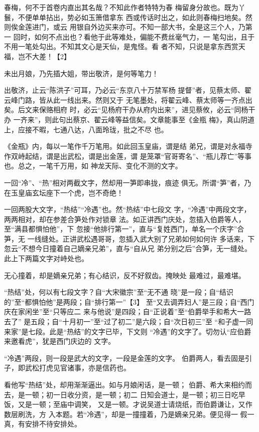 \documentclass[UTF8,scheme=chinese,11pt,linespread=1.4]{ctexbook}
\makeatletter
\newenvironment{diben}[1]
  {\list{}{\listparindent 2em
    \itemindent\listparindent
    \rightmargin 0em  %
    \leftmargin 0em  %
    \parsep \z@ \@plus\p@}%
   \item\relax}
  {\endlist}
\makeatother
\begin{document}
\begin{diben}
写春梅，何不于首卷内直出其名哉？不知此作者特特为春
梅留身分故也。既为丫鬟，不便单单拈出，势必如玉箫借拿东
西或传话时出之，如此则春梅扫地矣。然则俟金莲进门，或云
用银自外边买来亦可。不知一部大书，全是这三个人，乃第一
回时，如何不点出也？看他于此等难处，偏能不费丝毫气力，一
笔勾出，且于不用一笔处勾出。不知其文心是天仙，是鬼怪。看
者不知，只说是拿东西赏天福，岂不大差！【2】

未出月娘，乃先插大姐，带出敬济，是何等笔力！

出敬济，止云“陈洪子”可耳，乃必云“东京八十万禁军杨
提督”者，见蔡太师、翟云峰门路，皆从此一线出来。然则又于
无笔墨处，将翟云峰、蔡太师等一齐点出矣。后文来保赂相府
时，必云“见杨府干办从府内出来”，进见蔡攸，必云“同杨干办
一齐来”，则此句出蔡京、翟云峰等益信矣。文章能事至《金瓶
梅》，真山阴道上，应接不暇，七通八达，八面玲珑，批之不尽
也。

《金瓶》内，每以一笔作千万笔用。如此回玉皇庙，谓是结
弟兄，谓是对永福寺作双峙起结，谓是出武松，谓是出金莲，谓
是笼罩“官哥寄名”、“瓶儿荐亡”等事也。总之，一笔千万用，如
神龙天际、变化不测的文字。

一回“冷”、“热”相对两截文字，然却用一笋即串拢，痕迹
俱无。所谓“笋”者，乃在玉皇庙玄坛座下一个虎，岂不奇绝！

一回两股大文字，“热结”“冷遇”也。然“热结”中七段文
字，“冷遇”中两段文字，两两相对，却在参差合笋处作对锁章
法。如正讲西门庆处，忽插入伯爵等人，至“满县都惧怕他”，下
忽接“他排行第一”，直与“复姓西门，单名一个庆字”合笋，无
一线缝处。正讲武松遇哥哥，忽插入武大别了兄弟如何如何许
多话来，下忽云“不想今日撞着自己嫡亲兄弟”，直与“自从兄
弟分别之后”合笋，无一缝处。此上下两篇文字对峙处也。

无心撞着，却是嫡亲兄弟；有心结识，反不好叙齿。掩映处
最难过，最难堪。

“热结”处，何以有七段文字？自“大宋徽宗”至“无不通
晓”是一段；自“结识的”至“都惧怕他”是两段；自“排行第一”【3】
至“又去调弄妇人”是三段；自“西门庆在家闲坐”至“只等应二
来与他说”是四段；自“正说着”至“伯爵举手和希大一路去了”
是五段；自“十月初一”至“过了初二”是六段；自“次日初三”至
“和子虚一同来家”是七段。此是“热结”的文字已毕，下文则
“冷遇”的文字了。切勿认“应伯爵来邀看虎”，犹是西门庆边的
文字。

“冷遇”两段，则一段是武大的文字，一段是金莲的文字。
伯爵两人，看去固是引子，即武松打虎见官诸事，亦是信药也。

看他写“热结”处，却用渐渐逼出。如与月娘闲话，是一顿；
伯爵、希大来相约而去，是一顿；初一日收分资，是一顿；初二
日知会道士，是一顿；初三日吃早饭，又是一顿；至庙中调笑，
又是一顿。才说吴道士请烧纸，而伯爵谦让，又作数层刷洗，方
入本题。若“冷遇”，却是一撞撞着，乃是嫡亲兄弟。便见得一
假一真，有安排不待安排处。


\end{diben}
\end{document}
